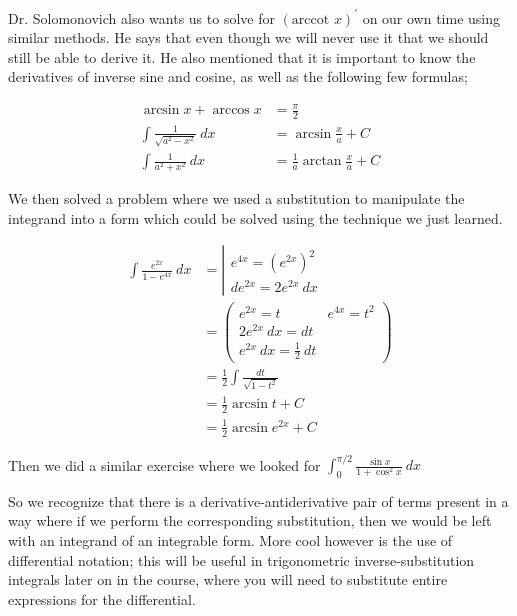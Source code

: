 \documentclass{article}
\begin{document}
Dr. Solomonovich also wants us to solve for $(\mbox{arccot }x)^\prime$ on our own time using similar methods. He says that even though we will never use it that we should still be able to derive it. He also mentioned that it is important to know the derivatives of inverse sine and cosine, as well as the following few formulas;

\begin{align}
\arcsin x+\arccos x&=\frac{\pi}{2}\\
\int\frac{1}{\sqrt{a^2-x^2}}\ dx&=\arcsin\frac{x}{a}+C\\
\int\frac{1}{a^2+x^2}\ dx&=\frac{1}{a}\arctan\frac{x}{a}+C
\end{align}

\vspace{10pt}

We then solved a problem where we used a substitution to manipulate the integrand into a form which could be solved using the technique we just learned.

\begin{align*}
\int\frac{e^{2x}}{1-e^{4x}}\ dx&=\left|\begin{array}{c}e^{4x}=(e^{2x})^2\\de^{2x}=2e^{2x}\ dx\end{array}\right.\\
&=\left(\begin{array}{cl}e^{2x}=t &e^{4x}=t^2\\2e^{2x}\ dx=dt&\\
e^{2x}\ dx=\frac{1}{2}\ dt&\end{array}\right)\\
&=\frac{1}{2}\int\frac{dt}{\sqrt{1-t^2}}\\
&=\frac{1}{2}\arcsin t+C\\
&=\frac{1}{2}\arcsin e^{2x}+C
\end{align*}

\vspace{10pt}

Then we did a similar exercise where we looked for $\displaystyle\int_0^{\pi/2}\frac{\sin x}{1+\cos^2x}\ dx$

\vspace{10pt}

So we recognize that there is a derivative-antiderivative pair of terms present in a way where if we perform the corresponding substitution, then we would be left with an integrand of an integrable form. More cool however is the use of differential notation; this will be useful in trigonometric inverse-substitution integrals later on in the course, where you will need to substitute entire expressions for the differential.
\end{document}
